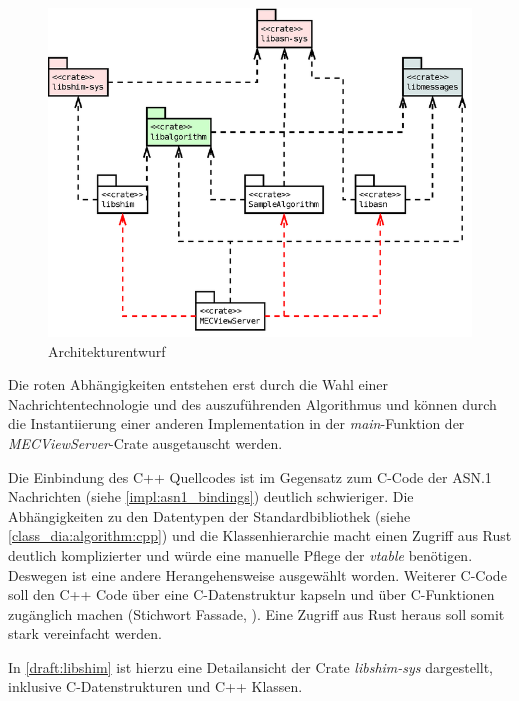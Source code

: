 \begin{figure}[H]
	\centering
	\includegraphics[width=1.9\textwidth]{dia/architecture_v2_packages}
	\caption{Architekturentwurf}
	\label{draft:architecture_v2_packages}
\end{figure}

Die roten Abhängigkeiten entstehen erst durch die Wahl einer Nachrichtentechnologie und des auszuführenden Algorithmus und können durch die Instantiierung einer anderen Implementation in der \textit{main}-Funktion der \textit{MECViewServer}-Crate ausgetauscht werden.


Die Einbindung des C++ Quellcodes ist im Gegensatz zum C-Code der ASN.1 Nachrichten (siehe \autoref{impl:asn1_bindings}) deutlich schwieriger.
Die Abhängigkeiten zu den Datentypen der Standardbibliothek (siehe \autoref{class_dia:algorithm:cpp}) und die Klassenhierarchie macht einen Zugriff aus Rust deutlich komplizierter und würde eine manuelle Pflege der \textit{vtable} benötigen.
Deswegen ist eine andere Herangehensweise ausgewählt worden.
Weiterer C-Code soll den C++ Code über eine C-Datenstruktur kapseln und über C-Funktionen zugänglich machen (Stichwort Fassade, \cite[700]{goll2018entwurfsprinzipien}).
Eine Zugriff aus Rust heraus soll somit stark vereinfacht werden.

In \autoref{draft:libshim} ist hierzu eine Detailansicht der Crate \textit{libshim-sys} dargestellt, inklusive C-Datenstrukturen und C++ Klassen.


